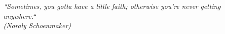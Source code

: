 \begin{epigrafe}
   \vspace*{\fill}
   \begin{citacao}
	\normalsize{
		\textit{``Sometimes, you gotta have a little faith; 
			otherwise you're never getting anywhere.``\\
		(Noraly Schoenmaker)}
	}
	\end{citacao}

\end{epigrafe}
